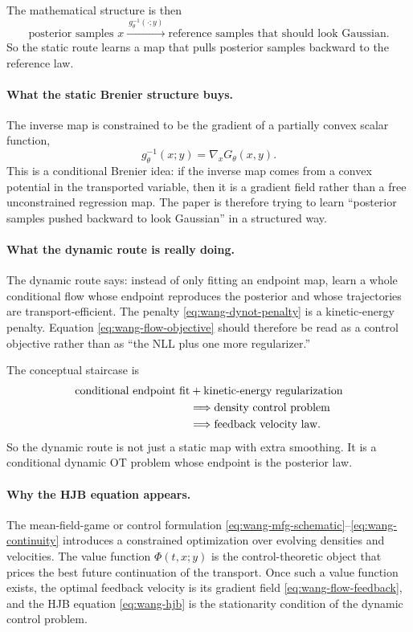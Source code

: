 \documentclass[11pt]{report}
\begin{document}
The mathematical structure is then
\begin{equation}
\text{posterior samples }x
\xrightarrow{\ g_\theta^{-1}(\cdot;y)\ }
\text{reference samples that should look Gaussian}.
\label{eq:wang-inverse-interpretation}
\end{equation}
So the static route learns a map that pulls posterior samples backward to the
reference law.

\paragraph{What the static Brenier structure buys.}
The inverse map is constrained to be the gradient of a partially convex scalar
function,
\begin{equation}
g_\theta^{-1}(x;y)=\nabla_x G_\theta(x,y).
\label{eq:wang-static-gradient-again}
\end{equation}
This is a conditional Brenier idea: if the inverse map comes from a convex
potential in the transported variable, then it is a gradient field rather than a
free unconstrained regression map.  The paper is therefore trying to learn
``posterior samples pushed backward to look Gaussian'' in a structured way.

\paragraph{What the dynamic route is really doing.}
The dynamic route says: instead of only fitting an endpoint map, learn a whole
conditional flow whose endpoint reproduces the posterior and whose trajectories are
transport-efficient.  The penalty \eqref{eq:wang-dynot-penalty} is a kinetic-energy
penalty.  Equation \eqref{eq:wang-flow-objective} should therefore be read as a
control objective rather than as ``the NLL plus one more regularizer.''

The conceptual staircase is
\begin{align}
\text{conditional endpoint fit}
&+ \text{kinetic-energy regularization}
\notag\\
&\Longrightarrow
\text{density control problem}
\notag\\
&\Longrightarrow
\text{feedback velocity law}.
\label{eq:wang-dynamic-logic-chain}
\end{align}
So the dynamic route is not just a static map with extra smoothing.  It is a
conditional dynamic OT problem whose endpoint is the posterior law.

\paragraph{Why the HJB equation appears.}
The mean-field-game or control formulation
\eqref{eq:wang-mfg-schematic}--\eqref{eq:wang-continuity} introduces a constrained
optimization over evolving densities and velocities.  The value function
$\Phi(t,x;y)$ is the control-theoretic object that prices the best future
continuation of the transport.  Once such a value function exists, the optimal
feedback velocity is its gradient field \eqref{eq:wang-flow-feedback}, and the HJB
equation \eqref{eq:wang-hjb} is the stationarity condition of the dynamic control
problem.
\end{document}
